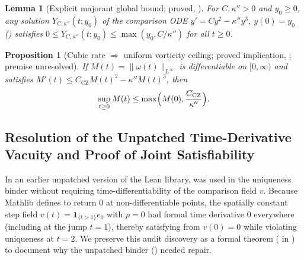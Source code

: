 \documentclass[11pt,a4paper]{article}
\theoremstyle{plain}
\newtheorem{proposition}{Proposition}[section]
\newtheorem{lemma}{Lemma}[section]
\theoremstyle{definition}
\theoremstyle{remark}
\newcommand{\CZ}{C_{\mathrm{CZ}}}
\begin{document}
\begin{lemma}[Explicit majorant global bound; proved, ]\label{lem:majorant}
For $C,\kappa''>0$ and $y_0\ge0$, any solution $Y_{C,\kappa''}(t;y_0)$ of the comparison ODE $y'=Cy^2-\kappa''y^3$, $y(0)=y_0$ () satisfies $0\le Y_{C,\kappa''}(t;y_0)\le\max(y_0,C/\kappa'')$ for all $t\ge0$.
\end{lemma}

\begin{proposition}[Cubic rate $\Rightarrow$ uniform vorticity ceiling; proved implication, ; premise unresolved]\label{prop:ceiling}
If $M(t)=\|\omega(t)\|_{L^\infty}$ is differentiable on $[0,\infty)$ and satisfies $M'(t)\le \CZ M(t)^2-\kappa''M(t)^3$, then
\[
\sup_{t\ge0}M(t)\le\max\Bigl(M(0),\frac{\CZ}{\kappa''}\Bigr).
\]
\end{proposition}

\subsection{Resolution of the Unpatched Time-Derivative Vacuity and Proof of Joint Satisfiability}\label{sec:vacuity}
In an earlier unpatched version of the Lean library,  was used in the uniqueness binder  without requiring time-differentiability of the comparison field $v$. Because Mathlib defines  to return $0$ at non-differentiable points, the spatially constant step field $v(t)=\mathbf 1_{\{t>1\}}e_0$ with $p=0$ had formal time derivative $0$ everywhere (including at the jump $t=1$), thereby satisfying  from $v(0)=0$ while violating uniqueness at $t=2$. We preserve this audit discovery as a formal theorem ( in ) to document why the unpatched binder () needed repair.
\end{document}
